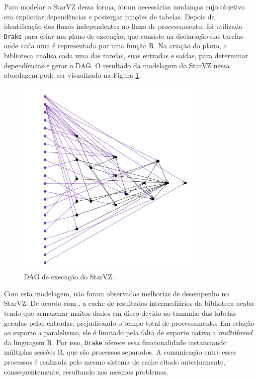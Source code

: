 Para modelar o StarVZ dessa forma, foram necessárias mudanças cujo objetivo era 
explicitar dependências e postergar junções de tabelas. Depois da identificação 
dos fluxos independentes no fluxo de processamento, foi utilizado \texttt{Drake} 
para criar um plano de execução, que consiste na declaração das tarefas onde 
cada uma é representada por uma função R. Na criação do plano, a biblioteca 
analisa cada uma das tarefas, suas entradas e saídas, para determinar 
dependências e gerar o DAG. O resultado da modelagem do StarVZ nessa abordagem 
pode ser visualizado na Figura \ref{fig:starvz-dag}.

\begin{figure}[ht]
\centerline{
\includegraphics[width=0.8\textwidth]{./img/drake-dag-final-origin.pdf}}
 \caption{DAG de execução do StarVZ.}
 \label{fig:starvz-dag}
\end{figure}

Com esta modelagem, não foram observadas melhorias de desempenho no StarVZ. De 
acordo com \citet{ref:drakestarvz}, a cache de resultados intermediários da 
biblioteca acaba tendo que armazenar muitos dados em disco devido ao tamanho 
das tabelas geradas pelas entradas, prejudicando o tempo total de processamento.
Em relação ao suporte a paralelismo, ele é limitado pela falta de suporte 
nativo a \emph{multithread} da linguagem R. Por isso, \texttt{Drake} oferece 
essa funcionalidade instanciando múltiplas sessões R, que são processos 
separados. A comunicação entre esses processos é realizada pelo mesmo sistema 
de cache citado anteriormente, consequentemente, resultando nos mesmos 
problemas.

